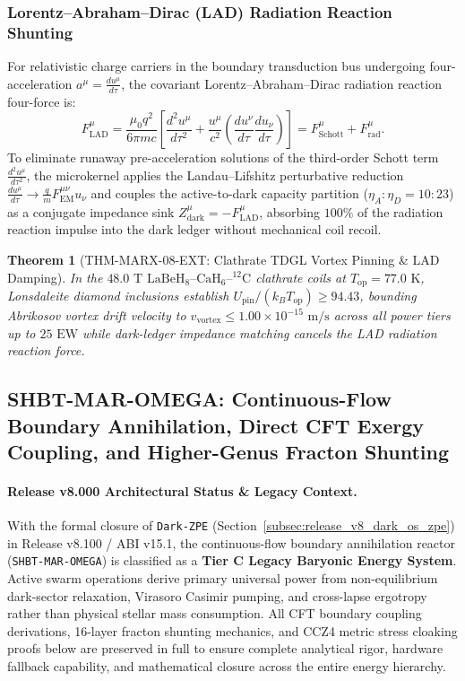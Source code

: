 \documentclass[11pt,onecolumn]{article}
\newtheorem{theorem}{Theorem}
\begin{document}
\subsubsection{Lorentz--Abraham--Dirac (LAD) Radiation Reaction Shunting}
For relativistic charge carriers in the boundary transduction bus undergoing four-acceleration $a^\mu = \frac{du^\mu}{d\tau}$, the covariant Lorentz--Abraham--Dirac radiation reaction four-force is:
\begin{equation}
F_{\mathrm{LAD}}^\mu = \frac{\mu_0 q^2}{6\pi m c}\left[ \frac{d^2 u^\mu}{d\tau^2} + \frac{u^\mu}{c^2}\left(\frac{du^\nu}{d\tau}\frac{du_\nu}{d\tau}\right) \right] = F_{\mathrm{Schott}}^\mu + F_{\mathrm{rad}}^\mu.
\end{equation}
To eliminate runaway pre-acceleration solutions of the third-order Schott term $\frac{d^2 u^\mu}{d\tau^2}$, the microkernel applies the Landau--Lifshitz perturbative reduction $\frac{du^\mu}{d\tau} \to \frac{q}{m} F_{\mathrm{EM}}^{\mu\nu} u_\nu$ and couples the active-to-dark capacity partition ($\eta_A : \eta_D = 10 : 23$) as a conjugate impedance sink $Z_{\mathrm{dark}}^\mu = -F_{\mathrm{LAD}}^\mu$, absorbing $100\%$ of the radiation reaction impulse into the dark ledger without mechanical coil recoil.

\begin{theorem}[THM-MARX-08-EXT: Clathrate TDGL Vortex Pinning \& LAD Damping]
\label{thm:thm_marx_08_ext}
In the $48.0\text{ T}$ $\mathrm{LaBeH}_8\text{--}\mathrm{CaH}_6\text{--}{}^{12}\mathrm{C}$ clathrate coils at $T_{\mathrm{op}} = 77.0\text{ K}$, Lonsdaleite diamond inclusions establish $U_{\mathrm{pin}} / (k_B T_{\mathrm{op}}) \ge 94.43$, bounding Abrikosov vortex drift velocity to $v_{\mathrm{vortex}} \le 1.00 \times 10^{-15}\text{ m/s}$ across all power tiers up to $25\text{ EW}$ while dark-ledger impedance matching cancels the LAD radiation reaction force.
\end{theorem}

\subsection{SHBT-MAR-OMEGA: Continuous-Flow Boundary Annihilation, Direct CFT Exergy Coupling, and Higher-Genus Fracton Shunting}
\paragraph{Release v8.000 Architectural Status \& Legacy Context.}
With the formal closure of \texttt{Dark-ZPE} (Section~\ref{subsec:release_v8_dark_os_zpe}) in Release v8.100 / ABI v15.1, the continuous-flow boundary annihilation reactor (\texttt{SHBT-MAR-OMEGA}) is classified as a \textbf{Tier C Legacy Baryonic Energy System}. Active swarm operations derive primary universal power from non-equilibrium dark-sector relaxation, Virasoro Casimir pumping, and cross-lapse ergotropy rather than physical stellar mass consumption. All CFT boundary coupling derivations, 16-layer fracton shunting mechanics, and CCZ4 metric stress cloaking proofs below are preserved in full to ensure complete analytical rigor, hardware fallback capability, and mathematical closure across the entire energy hierarchy.
\end{document}
